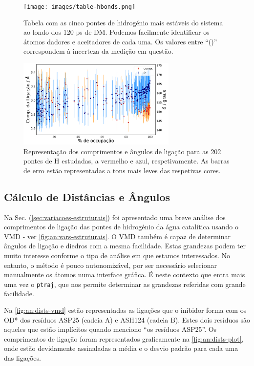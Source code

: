 \documentclass[12pt,a4paper]{article}
\begin{document}
	\begin{figure}[h]
		\centering
		\texttt{[image: images/table-hbonds.png]}
		\caption{Tabela com as cinco pontes de hidrogénio mais estáveis do sistema ao londo dos 120 ps de DM. Podemos facilmente identificar os átomos dadores e aceitadores de cada uma. Os valores entre ``()'' correspondem à incerteza da medição em questão.}
		\label{fig:an:hbonds-table}
	\end{figure}
	\begin{figure}[h]
		\centering
		\includegraphics[width=0.7\textwidth]{images/plots-hbonds-linear.pdf}
		\caption{Representação dos comprimentos e ângulos de ligação para as 202 pontes de H estudadas, a vermelho e azul, respetivamente. As barras de erro estão representadas a tons mais leves das respetivas cores.}
		\label{fig:an:hbonds-plot}	
	\end{figure}


\subsection{Cálculo de Distâncias e Ângulos}
	Na Sec. (\ref{sec:variacoes-estruturais}) foi apresentado uma breve análise dos comprimentos de ligação das pontes de hidrogénio da água catalítica usando o VMD - ver \cref{fig:an:vars-estruturais}. O VMD também é capaz de determinar ângulos de ligação e diedros com a mesma facilidade. Estas grandezas podem ter muito interesse conforme o tipo de análise em que estamos interessados. No entanto, o método é pouco autonomizável, por ser necessário selecionar manualmente os átomos numa interface gráfica. É neste contexto que entra mais uma vez o \verb|ptraj|, que nos permite determinar as grandezas referidas com grande facilidade.
	
	Na \cref{fig:an:dists-vmd} estão representadas as ligações que o inibidor forma com os OD* dos resíduos ASP25 (cadeia A)  e ASH124 (cadeia B). Estes dois resíduos são aqueles que estão implícitos quando menciono ``os resíduos ASP25''. Os comprimentos de ligação foram representados graficamente na \cref{fig:an:dists-plot}, onde estão devidamente assinaladas a média e o desvio padrão para cada uma das ligações.
	
\end{document}
